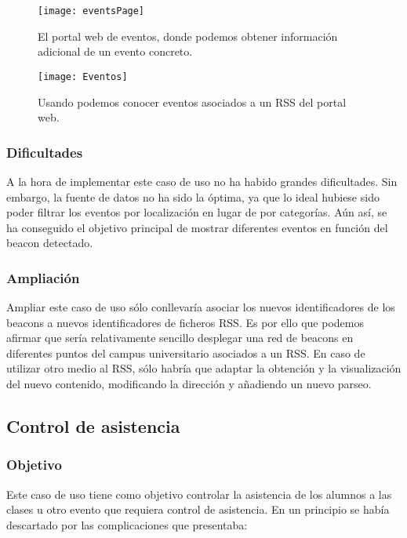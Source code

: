 \begin{figure}[H]
	\centering
	\texttt{[image: eventsPage]}
	\caption{El portal web de eventos, donde podemos obtener información adicional de un evento concreto.}
	\label{fig:eventsPage}
\end{figure}

\begin{figure}[H]
	\centering
	\texttt{[image: Eventos]}
	\caption{Usando \BulletPoint{} podemos conocer eventos asociados a un RSS del portal web.}
	\label{fig:eventos}
\end{figure}

\subsubsection{Dificultades}


A la hora de implementar este caso de uso no ha habido grandes dificultades. Sin embargo, la fuente de datos no ha sido la óptima, ya que lo ideal hubiese sido poder filtrar los eventos por localización en lugar de por categorías. Aún así, se ha conseguido el objetivo principal de mostrar diferentes eventos en función del beacon detectado.

\subsubsection{Ampliación}


Ampliar este caso de uso sólo conllevaría asociar los nuevos identificadores de los beacons a nuevos identificadores de ficheros RSS. Es por ello que podemos afirmar que sería relativamente sencillo desplegar una red de beacons en diferentes puntos del campus universitario asociados a un RSS. En caso de utilizar otro medio al RSS, sólo habría que adaptar la obtención y la visualización del nuevo contenido, modificando la dirección y añadiendo un nuevo parseo.


\subsection{Control de asistencia}

\subsubsection{Objetivo}

Este caso de uso tiene como objetivo controlar la asistencia de los alumnos a las clases u otro evento que requiera control de asistencia. En un principio se había descartado por las complicaciones que presentaba: 

